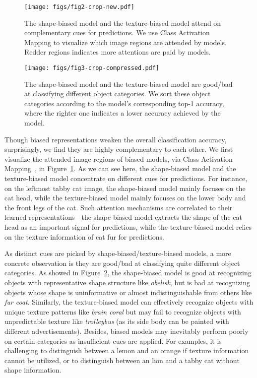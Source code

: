 \documentclass{article} \usepackage{iclr2021_conference,times}
\begin{document}
\begin{figure}[t]
    \centering
    \texttt{[image: figs/fig2-crop-new.pdf]}
    \vspace{-1.4em}
    \caption{The shape-biased model and the texture-biased model attend on complementary cues for predictions. We use Class Activation Mapping to visualize which image regions are attended by models. Redder regions indicates more attentions are paid by models. 
    }
    \label{fig:pred_comp2}
    \vspace{-0.3em}
\end{figure}


\begin{figure}[t]
    \centering
    \texttt{[image: figs/fig3-crop-compressed.pdf]}
    \vspace{-2em}
    \caption{
    The shape-biased model and the texture-biased model are good/bad at classifying different object categories. We sort these object categories according to the model's corresponding top-1 accuracy, where the righter one indicates a lower accuracy achieved by the model.
    }
    \label{fig:pred_comp3}
    \vspace{-1em}
\end{figure}


Though biased representations weaken the overall classification accuracy, surprisingly, we find they are highly complementary to each other. We first visualize the attended image regions of biased models, via Class Activation Mapping~\citep{zhou2016learning}, in Figure~\ref{fig:pred_comp2}. As we can see here, the shape-biased model and the texture-biased model concentrate on different cues for predictions. For instance, on the leftmost tabby cat image, the shape-biased model mainly focuses on the cat head, while the texture-biased model mainly focuses on the lower body and the front legs of the cat. Such attention mechanisms are correlated to their learned representations---the shape-biased model extracts the shape of the cat head as an important signal for predictions, while the texture-biased model relies on the texture information of cat fur for predictions. 

As distinct cues are picked by shape-biased/texture-biased models, a more concrete observation is they are good/bad at classifying quite different object categories. 
As showed in Figure~\ref{fig:pred_comp3}, the shape-biased model is good at recognizing objects with representative shape structure like \emph{obelisk}, but is bad at recognizing objects whose shape is uninformative or almost indistinguishable from others like \emph{fur coat}. Similarly, the texture-biased model can effectively recognize objects with unique texture patterns like \emph{brain coral} but may fail to recognize objects with unpredictable texture like \emph{trolleybus} (as its side body can be painted with different advertisements). Besides, biased models may inevitably perform poorly on certain categories as insufficient cues are applied.
For examples, it is challenging to distinguish between a lemon and an orange if texture information cannot be utilized, or to distinguish between an lion and a tabby cat without shape information. 
\end{document}
